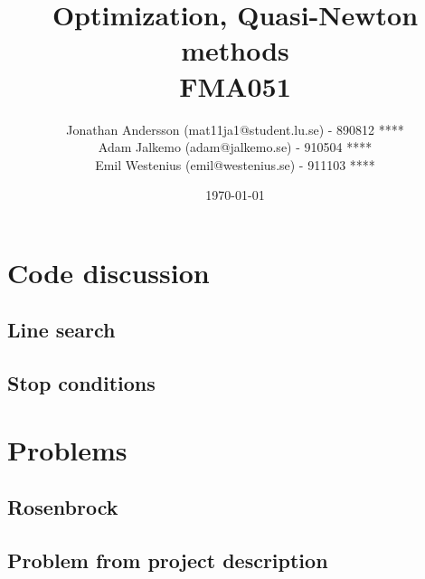 \documentclass{article}
\begin{document}
\title{Optimization, Quasi-Newton methods\\  FMA051} %

\author{Jonathan Andersson (mat11ja1@student.lu.se) - 890812 **** \\ Adam Jalkemo (adam@jalkemo.se) - 910504 **** \\ Emil Westenius (emil@westenius.se) - 911103 ****} %

\date{\today} %


\maketitle %
\pagebreak


\section{Code discussion}
\subsection{Line search}

\subsection{Stop conditions}




\section{Problems}
\subsection{Rosenbrock}

\subsection{Problem from project description}

\end{document}
